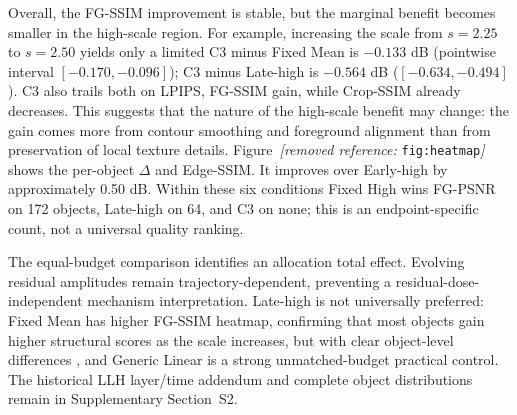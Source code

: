 \documentclass[times,twocolumn,final]{elsarticle}
\providecommand{\DIFadd}[1]{{\protect\color{blue} \sf #1}} %
\providecommand{\DIFdel}[1]{{\protect\color{red} \scriptsize #1}} %
\providecommand{\DIFaddbegin}{} %
\providecommand{\DIFaddend}{} %
\providecommand{\DIFdelbegin}{} %
\providecommand{\DIFdelend}{} %
\begin{document}
\DIFdelbegin \DIFdel{Overall, the FG-SSIM improvement is stable, but the marginal benefit becomes smaller in the high-scale region. For example, increasing the scale from $s = 2.25$ to $s = 2.50$ yields only a limited }\DIFdelend \DIFaddbegin \DIFadd{C3 minus Fixed Mean is $-0.133$ dB (pointwise interval $[-0.170,-0.096]$); C3 minus Late-high is $-0.564$ dB ($[-0.634,-0.494]$). C3 also trails both on LPIPS, }\DIFaddend FG-SSIM \DIFdelbegin \DIFdel{gain, while Crop-SSIM already decreases. This suggests that the nature of the high-scale benefit may change: the gain comes more from contour smoothing and foreground alignment than from preservation of local texture details. Figure~\textit{[removed reference: }\texttt{fig:heatmap}\textit{]} shows the per-object $\Delta$}\DIFdelend \DIFaddbegin \DIFadd{and Edge-SSIM. It improves over Early-high by approximately 0.50 dB. Within these six conditions Fixed High wins FG-PSNR on 172 objects, Late-high on 64, and C3 on none; this is an endpoint-specific count, not a universal quality ranking.
}

\DIFadd{The equal-budget comparison identifies an allocation total effect. Evolving residual amplitudes remain trajectory-dependent, preventing a residual-dose-independent mechanism interpretation. Late-high is not universally preferred: Fixed Mean has higher }\DIFaddend FG-SSIM\DIFdelbegin \DIFdel{heatmap, confirming that most objects gain higher structural scores as the scale increases, but with clear object-level differences}\DIFdelend \DIFaddbegin \DIFadd{, and Generic Linear is a strong unmatched-budget practical control. The historical LLH layer/time addendum and complete object distributions remain in Supplementary Section~S2}\DIFaddend .
\end{document}
